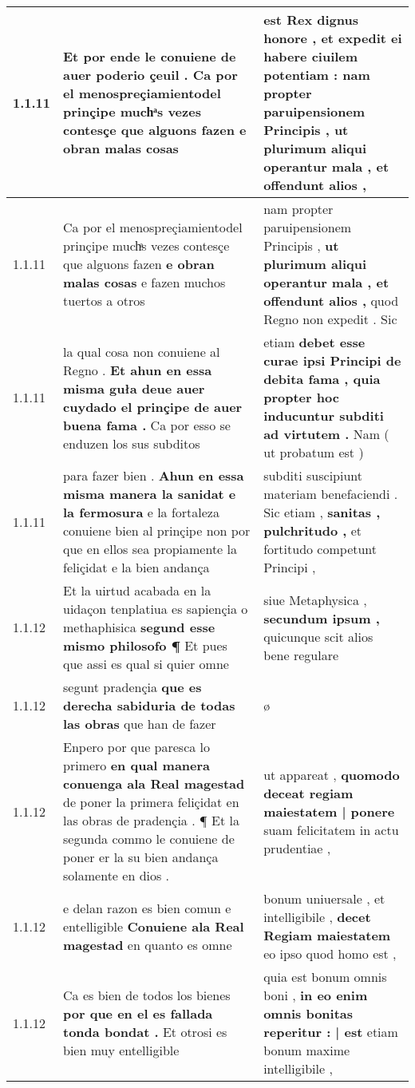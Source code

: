 \begin{tabular}{|p{1cm}|p{6.5cm}|p{6.5cm}|}
1.1.11 & Et por ende le conuiene de auer poderio çeuil . \textbf{ Ca por el menospreçiamientodel prinçipe muchͣs vezes contesçe que alguons fazen } e obran malas cosas & est Rex dignus honore , et expedit ei habere ciuilem potentiam : \textbf{ nam propter paruipensionem Principis , } ut plurimum aliqui operantur mala , et offendunt alios , \\\hline
1.1.11 & Ca por el menospreçiamientodel prinçipe muchͣs vezes contesçe que alguons fazen \textbf{ e obran malas cosas } e fazen muchos tuertos a otros & nam propter paruipensionem Principis , \textbf{ ut plurimum aliqui operantur mala , et offendunt alios , } quod Regno non expedit . Sic \\\hline
1.1.11 & la qual cosa non conuiene al Regno . \textbf{ Et ahun en essa misma guła deue auer cuydado el prinçipe de auer buena fama . } Ca por esso se enduzen los sus subditos & etiam \textbf{ debet esse curae ipsi Principi de debita fama , quia propter hoc inducuntur subditi ad virtutem . } Nam ( ut probatum est ) \\\hline
1.1.11 & para fazer bien . \textbf{ Ahun en essa misma manera la sanidat e la fermosura } e la fortaleza conuiene bien al prinçipe non por que en ellos sea propiamente la feliçidat e la bien andança & subditi suscipiunt materiam benefaciendi . Sic etiam , \textbf{ sanitas , pulchritudo , } et fortitudo competunt Principi , \\\hline
1.1.12 & Et la uirtud acabada en la uidaçon tenplatiua es sapiençia o methaphisica \textbf{ segund esse mismo philosofo ¶ } Et pues que assi es qual si quier omne & siue Metaphysica , \textbf{ secundum ipsum , } quicunque scit alios bene regulare \\\hline
1.1.12 & segunt pradençia \textbf{ que es derecha sabiduria de todas las obras } que han de fazer & ø \\\hline
1.1.12 & Enpero por que paresca lo primero \textbf{ en qual manera conuenga ala Real magestad } de poner la primera feliçidat en las obras de pradençia . ¶ Et la segunda commo le conuiene de poner er la su bien andança solamente en dios . & ut appareat , \textbf{ quomodo deceat regiam maiestatem | ponere } suam felicitatem in actu prudentiae , \\\hline
1.1.12 & e delan razon es bien comun e entelligible \textbf{ Conuiene ala Real magestad } en quanto es omne & bonum uniuersale , et intelligibile , \textbf{ decet Regiam maiestatem } eo ipso quod homo est , \\\hline
1.1.12 & Ca es bien de todos los bienes \textbf{ por que en el es fallada tonda bondat . } Et otrosi es bien muy entelligible & quia est bonum omnis boni , \textbf{ in eo enim omnis bonitas reperitur : | est } etiam bonum maxime intelligibile , \\\hline

\end{tabular}

